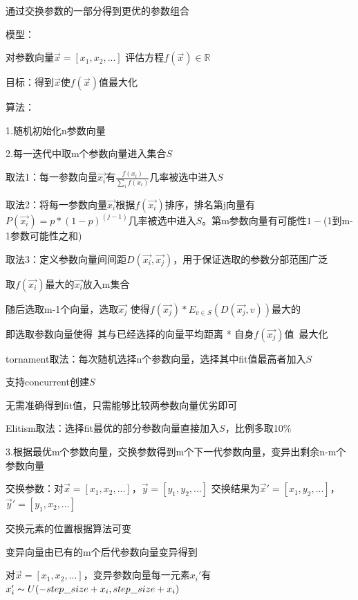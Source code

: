 \documentclass[UTF8]{ctexart}
\begin{document}
  通过交换参数的一部分得到更优的参数组合

  模型：

  \quad 对参数向量$\vec{x} = [x_1, x_2, ...]$ 评估方程$f(\vec{x}) \in \mathbb{R} $

  目标：得到$\vec{x}$使$f(\vec{x})$值最大化

  算法：

  \quad 1.随机初始化n参数向量

  \quad 2.每一迭代中取m个参数向量进入集合$S$

  \quad \quad 取法1：每一参数向量$\vec{x_i}$有$\frac{f(x_i)}{\sum_i f(x_i)}$几率被选中进入$S$

  \quad \quad 取法2：将每一参数向量$\vec{x_i}$根据$f(\vec{x_i})$排序，排名第j向量有$P(\vec{x_i}) = p * (1-p)^(j-1)$几率被选中进入$S$。第m参数向量有可能性$1-$(1到m-1参数可能性之和)

  \quad \quad 取法3：定义参数向量间间距$D(\vec{x_i}, \vec{x_j})$，用于保证选取的参数分部范围广泛

  \quad \quad \quad 取$f(\vec{x_i})$最大的$\vec{x_i}$放入m集合

  \quad \quad \quad 随后选取m-1个向量，选取$\vec{x_j}$ 使得$f(\vec{x_j}) * E_{v \in S}(D(\vec{x_j}, v))$最大的

  \quad \quad \quad 即选取参数向量使得\ 其与已经选择的向量平均距离 * 自身$f(\vec{x_j})$值\ 最大化

  \quad \quad tornament取法：每次随机选择n个参数向量，选择其中fit值最高者加入$S$

  \quad \quad \quad 支持concurrent创建$S$

  \quad \quad \quad 无需准确得到fit值，只需能够比较两参数向量优劣即可

  \quad \quad Elitism取法：选择fit最优的部分参数向量直接加入$S$，比例多取10\%

  \quad \quad \quad 

  \quad 3.根据最优m个参数向量，交换参数得到m个下一代参数向量，变异出剩余n-m个参数向量

  \quad \quad 交换参数：对$\vec{x} = [x_1, x_2, ...]$，$\vec{y} = [y_1, y_2, ...]$ 交换结果为$\vec{x}' = [x_1, y_2, ...]$，$\vec{y}' = [y_1, x_2, ...]$

  \quad \quad \quad 交换元素的位置根据算法可变

  \quad \quad 变异向量由已有的m个后代参数向量变异得到

  \quad \quad \quad 对$\vec{x} = [x_1, x_2, ...]$，变异参数向量每一元素$x_i'$有$x_i' \thicksim U(-step\_size + x_i, step\_size + x_i)$
\end{document}
